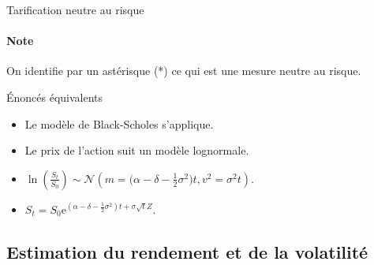 \documentclass[10pt, french]{article}
\begin{document}
\begin{multicols*}{2}
\begin{conceptgen}{Tarification neutre au risque}
\paragraph{Note}	On identifie par un astérisque (*) ce qui est une mesure neutre au risque.
\end{conceptgen}

\begin{conceptgen}{Énoncés équivalents}
\begin{itemize}[leftmargin = *]
	\item	Le modèle de Black-Scholes s'applique.
	\item	Le prix de l'action suit un modèle lognormale.
	\item	$\ln\left(\frac{S_{t}}{S_{0}}\right) \sim \mathcal{N}\left(m = \Big(\alpha - \delta - \frac{1}{2}\sigma^{2}\Big)t, v^{2} = \sigma^{2}t\right)$.
	\item	$S_{t} =	S_{0}\textrm{e}^{(\alpha - \delta - \frac{1}{2}\sigma^{2})t + \sigma\sqrt{t}Z}$.
\end{itemize}
\end{conceptgen}

\columnbreak

\subsection*{Estimation du rendement et de la volatilité}


\end{multicols*}
\end{document}
